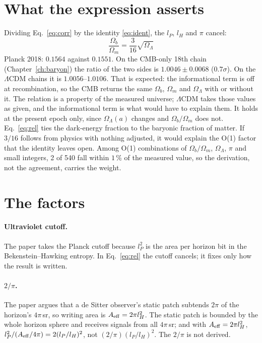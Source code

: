 \section{What the expression asserts}
Dividing Eq.~\eqref{eq:corr} by the identity \eqref{eq:ident}, the $l_P$, $l_H$ and $\pi$ cancel:
\begin{equation}\boxed{\;\frac{\Omega_b}{\Omega_m}=\frac{3}{16}\sqrt{\Omega_\Lambda}\;}\label{eq:rel}\end{equation}
Planck 2018: $0.1564$ against $0.1551$. On the CMB-only 18th chain (Chapter~\ref{ch:baryon}) the ratio of the two sides is
$1.0046\pm0.0068$ ($0.7\sigma$). On the $\Lambda$CDM chains it is $1.0056$--$1.0106$. That is expected: the informational term is off at recombination, so the
CMB returns the same $\Omega_b$, $\Omega_m$ and $\Omega_\Lambda$ with or without it. The relation is a property of the measured universe;
$\Lambda$CDM takes those values as given, and the informational term is what would have to explain them. It holds at the present epoch only, since $\Omega_\Lambda(a)$ changes and $\Omega_b/\Omega_m$ does not.
Eq.~\eqref{eq:rel} ties the dark-energy fraction to the baryonic fraction of matter. If $3/16$ follows from physics with nothing adjusted, it
would explain the O(1) factor that the identity leaves open. Among O(1) combinations of $\Omega_b/\Omega_m$, $\Omega_\Lambda$, $\pi$ and small
integers, 2 of 540 fall within $1\,\%$ of the measured value, so the derivation, not the agreement, carries the weight.

\section{The factors}
\paragraph{Ultraviolet cutoff.} The paper takes the Planck cutoff because $l_P^2$ is the area per horizon bit in the Bekenstein--Hawking entropy.
In Eq.~\eqref{eq:rel} the cutoff cancels; it fixes only how the result is written.
\paragraph{$2/\pi$.} The paper argues that a de Sitter observer's static patch subtends $2\pi$ of the horizon's $4\pi$\,sr, so writing area is
$A_{\rm eff}=2\pi l_H^2$. The static patch is bounded by the whole horizon sphere and receives signals from all $4\pi$\,sr; and with
$A_{\rm eff}=2\pi l_H^2$, $l_P^2/(A_{\rm eff}/4\pi)=2(l_P/l_H)^2$, not $(2/\pi)(l_P/l_H)^2$. The $2/\pi$ is not derived.
